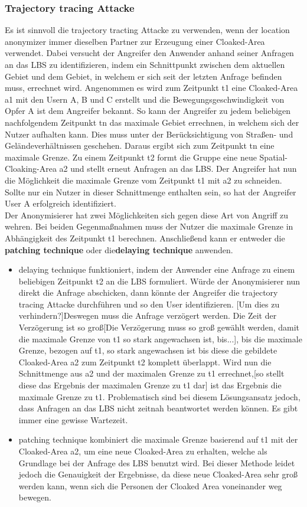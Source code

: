 \subsubsection{Trajectory tracing Attacke} 
Es ist sinnvoll die trajectory tracting Attacke zu verwenden, wenn der location anonymizer immer dieselben Partner zur Erzeugung einer Cloaked-Area verwendet. Dabei versucht der Angreifer den Anwender anhand seiner Anfragen an das LBS zu identifizieren, indem ein Schnittpunkt zwischen dem aktuellen Gebiet und dem Gebiet, in welchem er sich seit der letzten Anfrage befinden muss, errechnet wird. Angenommen es wird zum Zeitpunkt t1 eine Cloaked-Area a1 mit den Usern A, B und C erstellt und die Bewegungsgeschwindigkeit von Opfer A ist dem Angreifer bekannt. So kann der Angreifer zu jedem beliebigen nachfolgendem Zeitpunkt tn das maximale Gebiet errechnen, in welchem sich der Nutzer aufhalten kann. Dies muss unter der Berücksichtigung von Straßen- und Geländeverhältnissen geschehen. Daraus ergibt sich zum Zeitpunkt tn eine maximale Grenze. Zu einem Zeitpunkt t2 formt die Gruppe eine neue Spatial-Cloaking-Area a2 und stellt erneut Anfragen an das LBS. Der Angreifer hat nun die Möglichkeit die maximale Grenze vom Zeitpunkt t1 mit a2 zu schneiden. Sollte nur ein Nutzer in dieser Schnittmenge enthalten sein, so hat der Angreifer User A erfolgreich identifiziert.\\  Der Anonymisierer hat zwei Möglichkeiten sich gegen diese Art von Angriff zu wehren. Bei beiden Gegenmaßnahmen muss der Nutzer die maximale Grenze in Abhängigkeit des Zeitpunkt t1 berechnen. Anschließend kann er entweder die \textbf{patching technique} oder die\textbf{delaying technique} anwenden. 
\begin{itemize} 
\item{delaying technique} funktioniert, indem der Anwender eine Anfrage zu einem beliebigen Zeitpunkt t2 an die LBS formuliert. Würde der Anonymisierer nun direkt die Anfrage abschicken, dann könnte der Angreifer die trajectory tracing Attacke durchführen und so den User identifizieren. [Um dies zu verhindern?]Deswegen muss die Anfrage verzögert werden. Die Zeit der Verzögerung ist so groß[Die Verzögerung muss so groß gewählt werden, damit die maximale Grenze von t1 so stark angewachsen ist, bis...], bis die maximale Grenze, bezogen auf t1, so stark angewachsen ist bis diese die gebildete Cloaked-Area a2 zum Zeitpunkt t2 komplett überlappt. Wird nun die Schnittmenge aus a2 und der maximalen Grenze zu t1 errechnet,[so stellt diese das Ergebnis der maximalen Grenze zu t1 dar] ist das Ergebnis die maximale Grenze zu t1. Problematisch sind bei diesem Lösungsansatz jedoch, dass Anfragen an das LBS nicht zeitnah beantwortet werden können. Es gibt immer eine gewisse Wartezeit. 
\item{patching technique} kombiniert die maximale Grenze basierend auf t1 mit der Cloaked-Area a2, um eine neue Cloaked-Area zu erhalten, welche als Grundlage bei der Anfrage des LBS benutzt wird. Bei dieser Methode leidet jedoch die Genauigkeit der Ergebnisse, da diese neue Cloaked-Area sehr groß werden kann, wenn sich die Personen der Cloaked Area voneinander weg bewegen.  
\end{itemize} 
